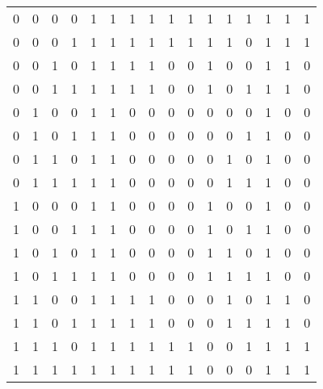 \documentclass{article}
\begin{document}
\begin{resolution}
\begin{table}[H]
\begin{tabular}[]{cccc|cc|cc|cc|ccc|ccc}
                0  & 0   & 0   & 0        & 1   & 1   & 1   & 1   & 1   & 1   & 1         & 1         & 1         & 1   & 1   & 1\\
                0  & 0   & 0   & 1        & 1   & 1   & 1   & 1   & 1   & 1   & 1         & 1         & 0         & 1   & 1   & 1\\
                0  & 0   & 1   & 0        & 1   & 1   & 1   & 1   & 0   & 0   & 1         & 0         & 0         & 1   & 1   & 0\\
                0  & 0   & 1   & 1        & 1   & 1   & 1   & 1   & 0   & 0   & 1         & 0         & 1         & 1   & 1   & 0\\
                0  & 1   & 0   & 0        & 1   & 1   & 0   & 0   & 0   & 0   & 0         & 0         & 0         & 1   & 0   & 0\\
                0  & 1   & 0   & 1        & 1   & 1   & 0   & 0   & 0   & 0   & 0         & 0         & 1         & 1   & 0   & 0\\
                0  & 1   & 1   & 0        & 1   & 1   & 0   & 0   & 0   & 0   & 0         & 1         & 0         & 1   & 0   & 0\\
                0  & 1   & 1   & 1        & 1   & 1   & 0   & 0   & 0   & 0   & 0         & 1         & 1         & 1   & 0   & 0\\
                1  & 0   & 0   & 0        & 1   & 1   & 0   & 0   & 0   & 0   & 1         & 0         & 0         & 1   & 0   & 0\\
                1  & 0   & 0   & 1        & 1   & 1   & 0   & 0   & 0   & 0   & 1         & 0         & 1         & 1   & 0   & 0\\
                1  & 0   & 1   & 0        & 1   & 1   & 0   & 0   & 0   & 0   & 1         & 1         & 0         & 1   & 0   & 0\\
                1  & 0   & 1   & 1        & 1   & 1   & 0   & 0   & 0   & 0   & 1         & 1         & 1         & 1   & 0   & 0\\
                1  & 1   & 0   & 0        & 1   & 1   & 1   & 1   & 0   & 0   & 0         & 1         & 0         & 1   & 1   & 0\\
                1  & 1   & 0   & 1        & 1   & 1   & 1   & 1   & 0   & 0   & 0         & 1         & 1         & 1   & 1   & 0\\
                1  & 1   & 1   & 0        & 1   & 1   & 1   & 1   & 1   & 1   & 0         & 0         & 1         & 1   & 1   & 1\\
                1  & 1   & 1   & 1        & 1   & 1   & 1   & 1   & 1   & 1   & 0         & 0         & 0         & 1   & 1   & 1\\\hline

\end{tabular}
\end{table}
\end{resolution}
\end{document}

